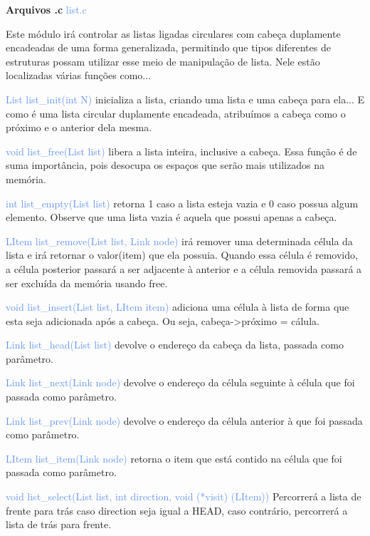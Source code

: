 \documentclass[a4paper,12pt]{article}
\begin{document}
\bigskip
\bigskip
\bigskip

{\Large \textcolor{NavyBlue}{ \textbf{Arquivos .c  }}}{\large \textcolor{CornflowerBlue}{  list.c}}
\bigskip

Este módulo irá controlar as listas ligadas circulares com cabeça duplamente encadeadas de uma forma generalizada, permitindo que tipos diferentes de estruturas possam utilizar esse meio de manipulação de lista.
Nele estão localizadas várias funções como...

{\textcolor{CornflowerBlue}{List list\_init(int N)}} inicializa a lista, criando uma lista e uma cabeça para ela... E como é uma lista circular duplamente encadeada, atribuímos a cabeça como o próximo e o anterior dela mesma.

{\textcolor{CornflowerBlue}{void list\_free(List list)}} libera a lista inteira, inclusive a cabeça. Essa função é de suma importância, pois desocupa os espaços que serão mais utilizados na memória.

{\textcolor{CornflowerBlue}{int list\_empty(List list)}} retorna 1 caso a lista esteja vazia e 0 caso possua algum elemento.
Observe que uma lista vazia é aquela que possui apenas a cabeça. 

{\textcolor{CornflowerBlue}{LItem list\_remove(List list, Link node)}} irá remover uma determinada célula da lista e irá retornar o valor(item) que ela possuia.
Quando essa célula é removido, a célula posterior passará a ser adjacente à anterior e a célula removida passará a ser excluída da memória usando free.

{\textcolor{CornflowerBlue}{void list\_insert(List list, LItem item)}} adiciona uma célula à lista de forma que esta seja adicionada após a cabeça. Ou seja, cabeça->próximo = cálula. 

{\textcolor{CornflowerBlue}{Link  list\_head(List list)}} devolve o endereço da cabeça da lista, passada como parâmetro.

{\textcolor{CornflowerBlue}{Link  list\_next(Link node)}} devolve o endereço da célula seguinte à célula que foi passada como parâmetro.

{\textcolor{CornflowerBlue}{Link  list\_prev(Link node)}} devolve o endereço da célula anterior à que foi passada como parâmetro.

{\textcolor{CornflowerBlue}{LItem list\_item(Link node)}} retorna o item que está contido na célula que foi passada como parâmetro.

{\textcolor{CornflowerBlue}{void list\_select(List list, int direction, void (*visit) (LItem))}} Percorrerá a lista de frente 
para trás caso direction seja igual a HEAD, caso contrário, percorrerá a lista de trás para frente.
\end{document}
